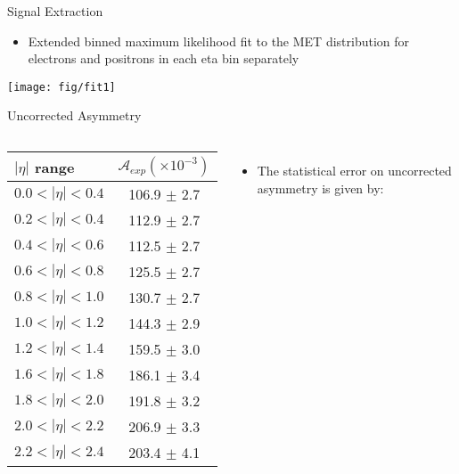 \documentclass[t, 8pt]{beamer}
\begin{document}
\begin{frame}{Signal Extraction}
  \begin{itemize}
    \item Extended binned maximum likelihood fit to the MET distribution for
    electrons and positrons in each eta bin separately
  \end{itemize}
    \begin{center}
      \texttt{[image: fig/fit1]}
    \end{center}
\end{frame}

\begin{frame}{Uncorrected Asymmetry}
  \begin{columns}[c]

   \begin{table}[h]
     \begin{center}
       \begin{tabular}{|l|c|}
       \hline
       $|\eta|$ range & $\mathcal{A}_{exp} (\times 10^{-3})$\\
       \hline    
       \hline
       $0.0<|\eta|<0.4$ & 106.9 $\pm$ 2.7\\
       $0.2<|\eta|<0.4$ & 112.9 $\pm$ 2.7\\
       $0.4<|\eta|<0.6$ & 112.5 $\pm$ 2.7\\
       $0.6<|\eta|<0.8$ & 125.5 $\pm$ 2.7\\
       $0.8<|\eta|<1.0$ & 130.7 $\pm$ 2.7\\
       $1.0<|\eta|<1.2$ & 144.3 $\pm$ 2.9\\
       $1.2<|\eta|<1.4$ & 159.5 $\pm$ 3.0 \\
       $1.6<|\eta|<1.8$ & 186.1 $\pm$ 3.4\\
       $1.8<|\eta|<2.0$ & 191.8 $\pm$ 3.2\\
       $2.0<|\eta|<2.2$ & 206.9 $\pm$ 3.3\\
       $2.2<|\eta|<2.4$ & 203.4 $\pm$ 4.1\\
       \hline
       \end{tabular}
     \end{center}
   \end{table}
  \begin{itemize}
  \item The statistical error on uncorrected asymmetry is given by:


\end{itemize}
\end{columns}
\end{frame}
\end{document}
